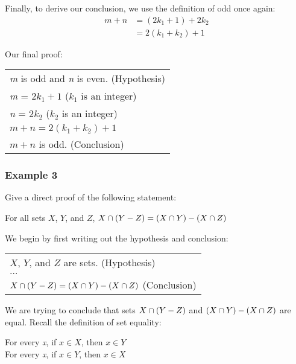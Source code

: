 Finally, to derive our conclusion, we use the definition of odd once again:
\begin{align*}
    m + n &= (2k_1 + 1) + 2k_2\\
    &= 2(k_1 + k_2) + 1
\end{align*}

Our final proof:

\begin{table}[h]
\centering
\begin{tabular}{l}
\textit{m} is odd and \textit{n} is even. (Hypothesis)\\
\textit{m} = $2k_1 + 1$ ($k_1$ is an integer)\\
\textit{n} = $2k_2$ ($k_2$ is an integer)\\
$m + n = 2(k_1 + k_2) + 1$\\
$m + n$ is odd. (Conclusion)
\end{tabular}
\end{table}

\subsubsection*{Example 3}

Give a direct proof of the following statement:
\begin{center}
    For all sets $X$, $Y$, and $Z$, $X \cap (Y - Z) = (X \cap Y) - (X \cap Z)$
\end{center}

We begin by first writing out the hypothesis and conclusion:

\begin{table}[h]
\centering
\begin{tabular}{l}
$X$, $Y$, and $Z$ are sets. (Hypothesis)\\
$\dots$\\
$X \cap (Y - Z) = (X \cap Y) - (X \cap Z)$ (Conclusion)
\end{tabular}
\end{table}

We are trying to conclude that sets $X \cap (Y - Z)$ and $(X \cap Y) - (X \cap Z)$ are equal.  Recall the definition of set equality:
\begin{center}
    For every \textit{x}, if $x \in X$, then $x \in Y$\\
    For every \textit{x}, if $x \in Y$, then $x \in X$
\end{center}

